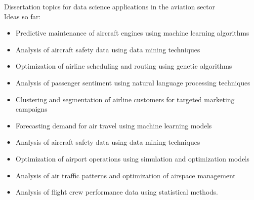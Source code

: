 Dissertation topics for data science applications in the aviation sector\\

Ideas so far:
\begin{itemize}
    \item Predictive maintenance of aircraft engines using machine learning algorithms
    \item Analysis of aircraft safety data using data mining techniques
    \item Optimization of airline scheduling and routing using genetic algorithms
    \item Analysis of passenger sentiment using natural language processing techniques
    \item Clustering and segmentation of airline customers for targeted marketing campaigns
    \item Forecasting demand for air travel using machine learning models
    \item Analysis of aircraft safety data using data mining techniques
    \item Optimization of airport operations using simulation and optimization models
    \item Analysis of air traffic patterns and optimization of airspace management
    \item Analysis of flight crew performance data using statistical methods.
\end{itemize}
